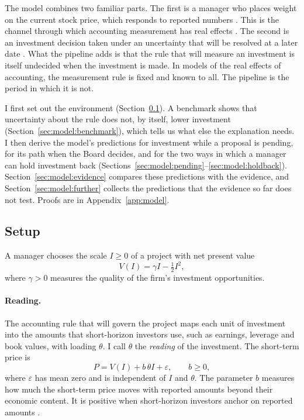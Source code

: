 The model combines two familiar parts. The first is a manager who places weight on the current stock price, which responds to reported numbers \citep{narayanan1985managerial,stein1989efficient,bebchuk1993short}. This is the channel through which accounting measurement has real effects \citep{kanodia2016real}. The second is an investment decision taken under an uncertainty that will be resolved at a later date \citep{bernanke1983irreversibility,mcdonald1986value,dixit1994investment}. What the pipeline adds is that the rule that will measure an investment is itself undecided when the investment is made. In models of the real effects of accounting, the measurement rule is fixed and known to all. The pipeline is the period in which it is not.

I first set out the environment (Section~\ref{sec:model:setup}). A benchmark shows that uncertainty about the rule does not, by itself, lower investment (Section~\ref{sec:model:benchmark}), which tells us what else the explanation needs. I then derive the model's predictions for investment while a proposal is pending, for its path when the Board decides, and for the two ways in which a manager can hold investment back (Sections~\ref{sec:model:pending}--\ref{sec:model:holdback}). Section~\ref{sec:model:evidence} compares these predictions with the evidence, and Section~\ref{sec:model:further} collects the predictions that the evidence so far does not test. Proofs are in Appendix~\ref{app:model}.

\subsection{Setup}\label{sec:model:setup}

A manager chooses the scale $I\ge 0$ of a project with net present value
\begin{equation}\label{eq:model:npv}
  V(I)=\gamma I-\tfrac{1}{2}I^{2},
\end{equation}
where $\gamma>0$ measures the quality of the firm's investment opportunities.

\paragraph{Reading.} The accounting rule that will govern the project maps each unit of investment into the amounts that short-horizon investors use, such as earnings, leverage and book values, with loading $\theta$. I call $\theta$ the \emph{reading} of the investment. The short-term price is
\begin{equation}\label{eq:model:price}
  P=V(I)+b\,\theta I+\varepsilon,\qquad b\ge 0,
\end{equation}
where $\varepsilon$ has mean zero and is independent of $I$ and $\theta$. The parameter $b$ measures how much the short-term price moves with reported amounts beyond their economic content. It is positive when short-horizon investors anchor on reported amounts \citep{bushee2001institutional,hirshleifer2003limited}.

